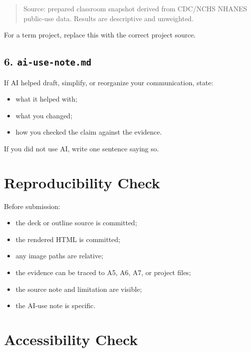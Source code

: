 \documentclass[
  letterpaper,
  DIV=11,
  numbers=noendperiod,
  oneside]{scrreprt}
\providecommand{\tightlist}{%
  \setlength{\itemsep}{0pt}\setlength{\parskip}{0pt}}
\begin{document}
\begin{quote}
Source: prepared classroom snapshot derived from CDC/NCHS NHANES
public-use data. Results are descriptive and unweighted.
\end{quote}

For a term project, replace this with the correct project source.

\subsection*{\texorpdfstring{6.
\texttt{ai-use-note.md}}{6. ai-use-note.md}}\label{ai-use-note.md-3}

If AI helped draft, simplify, or reorganize your communication, state:

\begin{itemize}
\tightlist
\item
  what it helped with;
\item
  what you changed;
\item
  how you checked the claim against the evidence.
\end{itemize}

If you did not use AI, write one sentence saying so.

\section*{Reproducibility Check}\label{reproducibility-check-2}


Before submission:

\begin{itemize}
\tightlist
\item
  the deck or outline source is committed;
\item
  the rendered HTML is committed;
\item
  any image paths are relative;
\item
  the evidence can be traced to A5, A6, A7, or project files;
\item
  the source note and limitation are visible;
\item
  the AI-use note is specific.
\end{itemize}

\section*{Accessibility Check}\label{accessibility-check}
\end{document}
